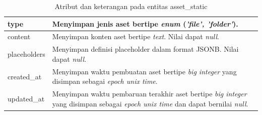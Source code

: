 \begin{enumerate}[label*=\arabic*.,ref=\arabic*]
\begin{enumerate}[label=\arabic*.]
\begin{table}[H]
\begin{tabular}{|p{3.25cm}|p{8cm}|}
                type                               & Menyimpan jenis aset bertipe \textit{enum} (\textit{'file', 'folder'}). \\ \hline
                content                            & Menyimpan konten aset bertipe \textit{text}. Nilai dapat \textit{null}. \\ \hline
                placeholders                       & Menyimpan definisi placeholder dalam format JSONB. Nilai dapat \textit{null}. \\ \hline
                created\_at                        & Menyimpan waktu pembuatan aset bertipe \textit{big integer} yang disimpan sebagai \textit{epoch unix time}. \\ \hline
                updated\_at                        & Menyimpan waktu pembaruan terakhir aset bertipe \textit{big integer} yang disimpan sebagai \textit{epoch unix time} dan dapat bernilai \textit{null}. \\ \hline
            \end{tabular}
            \caption{Atribut dan keterangan pada entitas asset\_static}
            \label{tab:asset_static_entity}
        \end{table}


\end{enumerate}
\end{enumerate}
